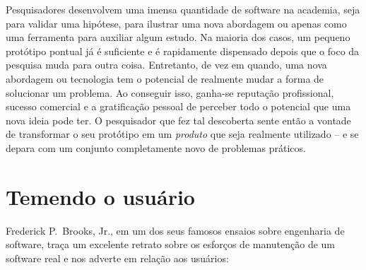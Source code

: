 

\noindent{}Pesquisadores desenvolvem uma imensa quantidade de software na academia,
seja para validar uma hipótese, para ilustrar uma nova abordagem ou apenas como uma
ferramenta para auxiliar algum estudo. Na maioria dos casos, um pequeno protótipo pontual
já é suficiente e é rapidamente dispensado depois que o foco da pesquisa muda para
outra coisa. Entretanto, de vez em quando, uma nova abordagem ou tecnologia tem
o potencial de realmente mudar a forma de solucionar um problema. Ao conseguir isso, 
ganha-se reputação profissional, sucesso comercial e a gratificação pessoal de perceber 
todo o potencial que uma nova ideia pode ter. O pesquisador que fez tal descoberta sente
então a vontade de transformar o seu protótipo em um \textit{produto} que seja realmente 
utilizado -- e se depara com um conjunto completamente novo de problemas práticos.

\section*{Temendo o usuário}

Frederick P.\ Brooks, Jr., em um dos seus famosos ensaios sobre engenharia de software,
traça um excelente retrato sobre os esforços de manutenção de um software real e
nos adverte em relação aos usuários:

